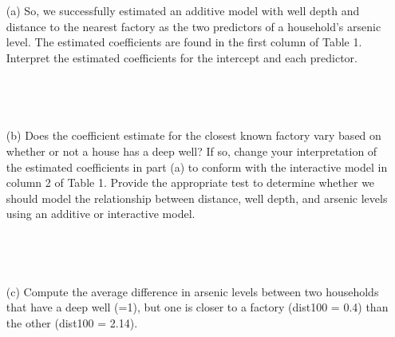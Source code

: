 \documentclass[12pt,letterpaper]{article}
\begin{document}
{\begin{enumerate}
	
	Predicted Fatness Index of Ewe group = -18.137 -8.362*0 -4.072*0
	Predicted Fatness Index of Ewe group = -18.137
	
	They are all negative values, so it does not make sense? If I ignore the negative values, then the Wether group has the highest Fatness index for every weight.
	
	DONE- ISH
	
		\begin{verbatim}
			
			
		\end{verbatim}
		\vspace{.5cm}
	\section*{Question 3: Arsenic}  
		\item [(a)] 
		So, we successfully estimated an additive model with well depth and distance to the
		nearest factory as the two predictors of a household’s arsenic level. The estimated
		coefficients are found in the first column of Table 1. Interpret the estimated coefficients
		for the intercept and each predictor.
		
		
		\begin{verbatim}
		
			
			
		\end{verbatim}
		\item [(b)] Does the coefficient estimate for the closest known factory vary based on whether or not
		a house has a deep well? If so, change your interpretation of the estimated coefficients
		in part (a) to conform with the interactive model in column 2 of Table 1. Provide
		the appropriate test to determine whether we should model the relationship between
		distance, well depth, and arsenic levels using an additive or interactive model.

		
		\begin{verbatim}
			
			
			
		\end{verbatim}
	\item [(c)] Compute the average difference in arsenic levels between two households that have a
	deep well (=1), but one is closer to a factory (dist100 = 0.4) than the other (dist100 =
	2.14).
	
	\begin{verbatim}
		
		
		

\end{verbatim}
\end{enumerate}}
\end{document}

